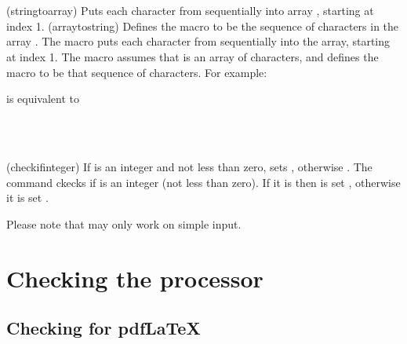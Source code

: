 \begin{syntax}
\cmd{\stringtoarray} \\
\cmd{\arraytostring} \\
\end{syntax}
\glossary(stringtoarray)%
  {}%
  {Puts each character from  sequentially into array 
   , starting at index 1.}
\glossary(arraytostring)%
  {}%
  {Defines the macro  to be the sequence of characters
   in the array .}
The macro \cmd{\stringtoarray} puts each character
from  sequentially into the  array, starting
at index 1.
The macro \cmd{\arraytostring} assumes
that  is an array of characters, and defines the macro
 to be that sequence of characters. For example: \\
\begin{lcode}
\end{lcode}
is equivalent to 
\begin{lcode}
\def\MyString{Chars}
\end{lcode}

\begin{syntax}
\cmd{\checkifinteger} \\
 \\
\end{syntax}
\glossary(checkifinteger)%
  {}%
  {If  is an integer and not less than zero, sets 
   \ptrue, otherwise \pfalse.}
The command \cmd{\checkifinteger} ckecks if  is an integer 
(not less than zero). If it is then  is set \ptrue, 
otherwise it is set \pfalse.
%
\begin{note}
  Please note that \cmd{\checkifinteger} may only work on simple input.
\end{note}


\section{Checking the processor}

\subsection{Checking for pdfLaTeX}

